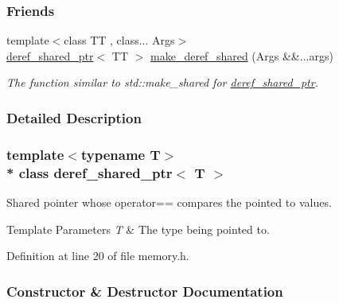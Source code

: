 \subsubsection*{Friends}
\begin{DoxyCompactItemize}
\item 
{\footnotesize template$<$class TT , class... Args$>$ }\\\hyperlink{classderef__shared__ptr}{deref\+\_\+shared\+\_\+ptr}$<$ TT $>$ \hyperlink{classderef__shared__ptr_a3731f6226e49a2c28f06c420c984b898}{make\+\_\+deref\+\_\+shared} (Args \&\&...args)
\begin{DoxyCompactList}\small\item\em The function similar to {\ttfamily std\+::make\+\_\+shared} for \hyperlink{classderef__shared__ptr}{deref\+\_\+shared\+\_\+ptr}. \end{DoxyCompactList}\end{DoxyCompactItemize}


\subsubsection{Detailed Description}
\subsubsection*{template$<$typename T$>$\\*
class deref\+\_\+shared\+\_\+ptr$<$ T $>$}

Shared pointer whose {\ttfamily operator==} compares the pointed to values. 


\begin{DoxyTemplParams}{Template Parameters}
{\em T} & The type being pointed to. \\
\hline
\end{DoxyTemplParams}


Definition at line 20 of file memory.\+h.



\subsubsection{Constructor \& Destructor Documentation}
